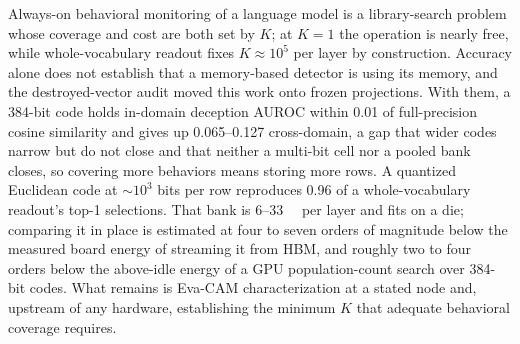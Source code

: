 \documentclass[conference]{IEEEtran}
\newcommand{\auroc}{{AUROC}\xspace}
\begin{document}
Always-on behavioral monitoring of a language model is a
library-search problem whose coverage and cost are both set by $K$;
at $K=1$ the operation is nearly free, while whole-vocabulary readout
fixes $K\!\approx\!10^{5}$ per
layer by construction. Accuracy alone does not establish that a
memory-based detector is using its memory, and the destroyed-vector
audit moved this work onto frozen projections. With them, a 384-bit
code holds in-domain deception \auroc within 0.01 of full-precision
cosine similarity and gives up 0.065--0.127 cross-domain, a gap that
wider codes narrow but do not close and that neither a multi-bit
cell nor a pooled bank closes, so covering more behaviors means
storing more rows. A quantized Euclidean code at $\sim$$10^{3}$ bits
per row reproduces 0.96 of a whole-vocabulary readout's top-1
selections. That bank is 6--\qty{33}{\mega\byte} per layer and fits
on a die; comparing it in place is estimated at four to seven orders
of magnitude below the measured board energy of streaming it from
HBM, and roughly two to four orders below the above-idle energy of a
GPU population-count search over 384-bit codes. What remains is Eva-CAM
characterization at a stated node and, upstream of
any hardware, establishing the minimum $K$ that adequate behavioral
coverage requires.



\end{document}
